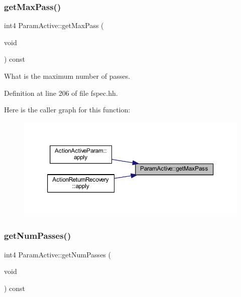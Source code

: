 \subsubsection{\texorpdfstring{getMaxPass()}{getMaxPass()}}
{\footnotesize\ttfamily int4 Param\+Active\+::get\+Max\+Pass (\begin{DoxyParamCaption}\item[{void}]{ }\end{DoxyParamCaption}) const\hspace{0.3cm}{\ttfamily [inline]}}



What is the maximum number of passes. 



Definition at line 206 of file fspec.\+hh.

Here is the caller graph for this function\+:
\nopagebreak
\begin{figure}[H]
\begin{center}
\leavevmode
\includegraphics[width=350pt]{class_param_active_a3d3a20decd7830cd778d890f6a41e83b_icgraph}
\end{center}
\end{figure}
\mbox{\label{class_param_active_af2221b328688426d4a192c0704ed787e}} 
\subsubsection{\texorpdfstring{getNumPasses()}{getNumPasses()}}
{\footnotesize\ttfamily int4 Param\+Active\+::get\+Num\+Passes (\begin{DoxyParamCaption}\item[{void}]{ }\end{DoxyParamCaption}) const\hspace{0.3cm}{\ttfamily [inline]}}



